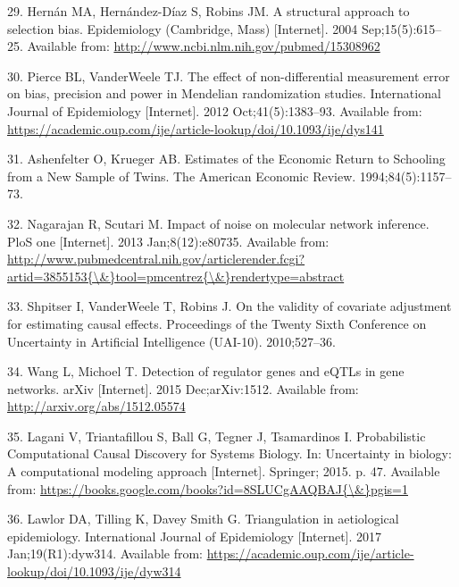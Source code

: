\documentclass[]{article}
\begin{document}
\hypertarget{ref-Hernan2004}{}
29. Hernán MA, Hernández-Díaz S, Robins JM. A structural approach to
selection bias. Epidemiology (Cambridge, Mass) {[}Internet{]}. 2004
Sep;15(5):615--25. Available from:
\url{http://www.ncbi.nlm.nih.gov/pubmed/15308962}

\hypertarget{ref-Pierce2012}{}
30. Pierce BL, VanderWeele TJ. The effect of non-differential
measurement error on bias, precision and power in Mendelian
randomization studies. International Journal of Epidemiology
{[}Internet{]}. 2012 Oct;41(5):1383--93. Available from:
\url{https://academic.oup.com/ije/article-lookup/doi/10.1093/ije/dys141}

\hypertarget{ref-Ashenfelter1994}{}
31. Ashenfelter O, Krueger AB. Estimates of the Economic Return to
Schooling from a New Sample of Twins. The American Economic Review.
1994;84(5):1157--73.

\hypertarget{ref-Nagarajan2013}{}
32. Nagarajan R, Scutari M. Impact of noise on molecular network
inference. PloS one {[}Internet{]}. 2013 Jan;8(12):e80735. Available
from:
\href{http://www.pubmedcentral.nih.gov/articlerender.fcgi?artid=3855153\%7B/\&\%7Dtool=pmcentrez\%7B/\&\%7Drendertype=abstract}{http://www.pubmedcentral.nih.gov/articlerender.fcgi?artid=3855153\{\textbackslash{}\&\}tool=pmcentrez\{\textbackslash{}\&\}rendertype=abstract}

\hypertarget{ref-Shpitser2010}{}
33. Shpitser I, VanderWeele T, Robins J. On the validity of covariate
adjustment for estimating causal effects. Proceedings of the Twenty
Sixth Conference on Uncertainty in Artificial Intelligence (UAI-10).
2010;527--36.

\hypertarget{ref-Wang2015}{}
34. Wang L, Michoel T. Detection of regulator genes and eQTLs in gene
networks. arXiv {[}Internet{]}. 2015 Dec;arXiv:1512. Available from:
\url{http://arxiv.org/abs/1512.05574}

\hypertarget{ref-Lagani2015}{}
35. Lagani V, Triantafillou S, Ball G, Tegner J, Tsamardinos I.
Probabilistic Computational Causal Discovery for Systems Biology. In:
Uncertainty in biology: A computational modeling approach
{[}Internet{]}. Springer; 2015. p. 47. Available from:
\href{https://books.google.com/books?id=8SLUCgAAQBAJ\%7B/\&\%7Dpgis=1}{https://books.google.com/books?id=8SLUCgAAQBAJ\{\textbackslash{}\&\}pgis=1}

\hypertarget{ref-Lawlor2017}{}
36. Lawlor DA, Tilling K, Davey Smith G. Triangulation in aetiological
epidemiology. International Journal of Epidemiology {[}Internet{]}. 2017
Jan;19(R1):dyw314. Available from:
\url{https://academic.oup.com/ije/article-lookup/doi/10.1093/ije/dyw314}
\end{document}
